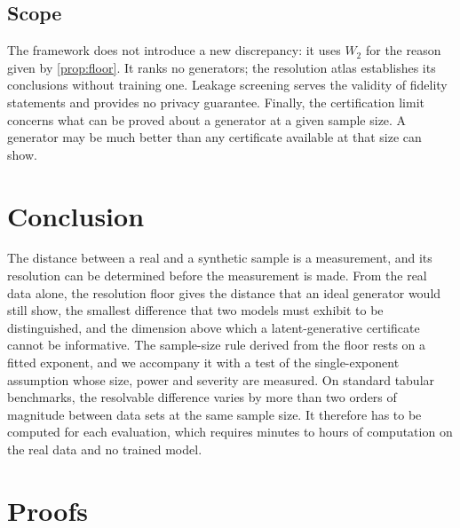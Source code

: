 \documentclass[twoside,11pt]{article}
\theoremstyle{plain}
\theoremstyle{definition}
\theoremstyle{remark}
\newcommand{\Wtwo}{\ensuremath{W_2}}
\begin{document}
\subsection{Scope}\label{sec:discussion-scope}

The framework does not introduce a new discrepancy: it uses $\Wtwo$ for the
reason given by \cref{prop:floor}. It ranks no generators; the resolution
atlas establishes its conclusions without training one. Leakage screening
serves the validity of fidelity statements and provides no privacy guarantee.
Finally, the certification limit concerns what can be proved about a
generator at a given sample size. A generator may be much better than any
certificate available at that size can show.

\section{Conclusion}\label{sec:conclusion}

The distance between a real and a synthetic sample is a measurement, and
its resolution can be determined before the measurement is made. From the
real data alone, the resolution floor gives the distance that an ideal
generator would still show, the smallest difference that two models must
exhibit to be distinguished, and the dimension above which a
latent-generative certificate cannot be informative. The sample-size rule
derived from the floor rests on a fitted exponent, and we accompany it with
a test of the single-exponent assumption whose size, power and severity are
measured. On standard tabular benchmarks, the resolvable difference varies
by more than two orders of magnitude between data sets at the same sample
size. It therefore has to be computed for each evaluation, which requires
minutes to hours of computation on the real data and no trained model.


\appendix
{}
\section{Proofs}\label{app:proofs}
\end{document}
